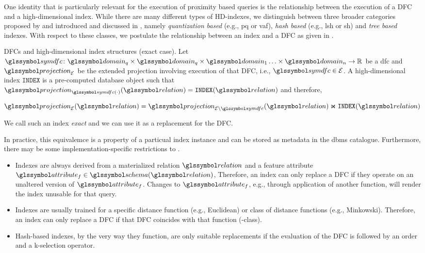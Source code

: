 One identity that is particularly relevant for the execution of proximity based queries is the relationship between the execution of a DFC and a high-dimensional index. While there are many different types of HD-indexes, we distinguish between three broader categories proposed by \cite{Lejsek:2018Transactional} and introduced and discussed in , namely \emph{quantization based} (e.g., \acrshort{pq} or \acrshort{vaf}), \emph{hash based} (e.g., \acrshort{lsh} or \acrshort{sh}) and \emph{tree based} indexes. With respect to these classes, we postulate the relationship between an index and a DFC as given in . 

\begin{definition}[label=definition:dfc_and_index]{DFCs and high-dimensional index structures (exact case).}{}
    Let $\symdfc \colon \domain_q \times \domain_q \times \domain_{1} \ldots \times \domain_{n} \to \mathbb{R}$ be a \acrshort{dfc} and $\projection_{\mathcal{E}}$ be the extended projection involving execution of that DFC, i.e., $\symdfc \in \mathcal{E}$. A high-dimensional index $\mathtt{INDEX}$ is a pre-computed database object such that $\projection_{\symdfc(\cdot)}(\relation) = \mathtt{INDEX}(\relation)$ and therefore, 

    \begin{equation}
        \projection_{\mathcal{E}} (\relation) = \projection_{\mathcal{E} \setminus \symdfc} (\relation) \Join \mathtt{INDEX} (\relation)
    \end{equation}
    
    We call such an index \emph{exact} and we can use it as a replacement for the DFC.
\end{definition}

In practice, this equivalemce is a property of a particual index instance and can be stored as metadata in the \acrshort{dbms} catalogue. Furthermore, there may be some implementation-specific restrictions to .

\begin{itemize}
    \item Indexes are always derived from a materialized relation $\relation$ and a feature attribute 
    $\attribute_f \in \schema(\relation)$, Therefore, an index can only replace a DFC if they operate on an unaltered version of $\attribute_f$. Changes to $\attribute_f$, e.g., through application of another function, will render the index unusable for that query.
    \item Indexes are usually trained for a specific distance function (e.g., Euclidean) or class of distance functions (e.g., Minkowski). Therefore, an index can only replace a DFC if that DFC coincides with that function (-class).
    \item Hash-based indexes, by the very way they function, are only suitable replacements if the evaluation of the DFC is followed by an order and a k-selection operator.
\end{itemize}

